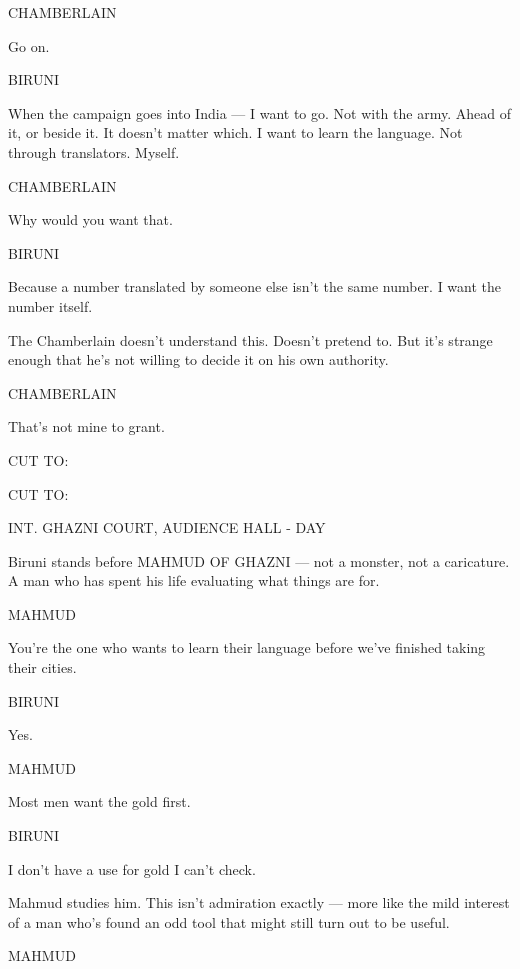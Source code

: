 \documentclass[12pt]{article}
\newcommand{\sceneheading}[1]{%
  \needspace{4\baselineskip}%
  \par\vspace{1\baselineskip}\noindent #1\par\vspace{0.6\baselineskip}%
}
\newcommand{\action}[1]{%
  \par\noindent #1\par\vspace{0.6\baselineskip}%
}
\newcommand{\transition}[1]{%
  \par\vspace{0.3\baselineskip}%
  \ifthenelse{\equal{#1}{FADE IN:}}%
    {\noindent #1\par}%
    {\noindent\hfill #1\par}%
  \vspace{0.6\baselineskip}%
}
\newcommand{\charcue}[1]{%
  \needspace{3\baselineskip}%
  \par\vspace{0.3\baselineskip}\noindent\hspace*{2.2in}#1\par%
}
\newenvironment{dialogue}{%
  \begin{list}{}{%
    \setlength{\leftmargin}{1.1in}%
    \setlength{\rightmargin}{1.6in}%
    \setlength{\listparindent}{0pt}%
    \setlength{\itemindent}{0pt}%
    \setlength{\parsep}{0pt}%
    \setlength{\itemsep}{0pt}%
    \setlength{\topsep}{0pt}%
  }\item[]%
}{%
  \end{list}\vspace{0.4\baselineskip}%
}
\begin{document}
\charcue{CHAMBERLAIN}
\begin{dialogue}
Go on.\\
\end{dialogue}
\charcue{BIRUNI}
\begin{dialogue}
When the campaign goes into India --- I want to go. Not with the army. Ahead of it, or beside it. It doesn't matter which. I want to learn the language. Not through translators. Myself.\\
\end{dialogue}
\charcue{CHAMBERLAIN}
\begin{dialogue}
Why would you want that.\\
\end{dialogue}
\charcue{BIRUNI}
\begin{dialogue}
Because a number translated by someone else isn't the same number. I want the number itself.\\
\end{dialogue}
\action{The Chamberlain doesn't understand this. Doesn't pretend to. But it's strange enough that he's not willing to decide it on his own authority.}
\charcue{CHAMBERLAIN}
\begin{dialogue}
That's not mine to grant.\\
\end{dialogue}
\transition{CUT TO:}
\sceneheading{INT. GHAZNI COURT, AUDIENCE HALL - DAY}
\action{Biruni stands before MAHMUD OF GHAZNI --- not a monster, not a caricature. A man who has spent his life evaluating what things are for.}
\charcue{MAHMUD}
\begin{dialogue}
You're the one who wants to learn their language before we've finished taking their cities.\\
\end{dialogue}
\charcue{BIRUNI}
\begin{dialogue}
Yes.\\
\end{dialogue}
\charcue{MAHMUD}
\begin{dialogue}
Most men want the gold first.\\
\end{dialogue}
\charcue{BIRUNI}
\begin{dialogue}
I don't have a use for gold I can't check.\\
\end{dialogue}
\action{Mahmud studies him. This isn't admiration exactly --- more like the mild interest of a man who's found an odd tool that might still turn out to be useful.}
\charcue{MAHMUD}
\end{document}
